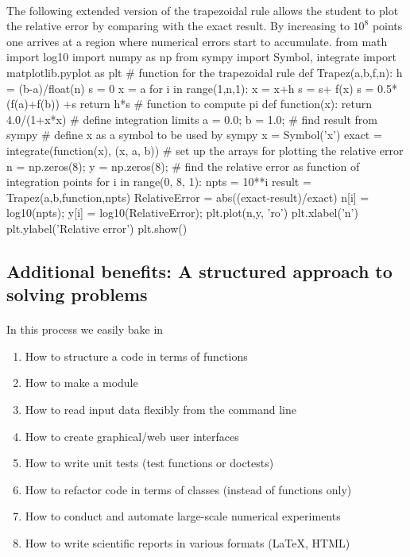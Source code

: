 \documentclass[%
twoside,                 %
final,                   %
10pt]{article}
\begin{document}
\paragraph{}
The following extended version of the trapezoidal rule allows the student to plot the relative error by comparing with the exact result. By increasing to $10^8$ points one arrives at a region where numerical errors start to accumulate.
\bpycod
from math import log10
import numpy as np
from sympy import Symbol, integrate
import matplotlib.pyplot as plt
# function for the trapezoidal rule
def Trapez(a,b,f,n):
   h = (b-a)/float(n)
   s = 0
   x = a
   for i in range(1,n,1):
       x = x+h
       s = s+ f(x)
   s = 0.5*(f(a)+f(b)) +s
   return h*s
#  function to compute pi
def function(x):
    return 4.0/(1+x*x)
# define integration limits
a = 0.0;  b = 1.0;
# find result from sympy
# define x as a symbol to be used by sympy
x = Symbol('x')
exact = integrate(function(x), (x, a, b))
# set up the arrays for plotting the relative error
n = np.zeros(8); y = np.zeros(8);
# find the relative error as function of integration points
for i in range(0, 8, 1):
    npts = 10**i
    result = Trapez(a,b,function,npts)
    RelativeError = abs((exact-result)/exact)
    n[i] = log10(npts); y[i] = log10(RelativeError);   
plt.plot(n,y, 'ro')
plt.xlabel('n')
plt.ylabel('Relative error')
plt.show()
\epycod





\subsection{Additional benefits: A structured approach to solving problems}

\paragraph{}
In this process we easily bake in
\begin{enumerate}
  \item How to structure a code in terms of functions

  \item How to make a module

  \item How to read input data flexibly from the command line

  \item How to create graphical/web user interfaces

  \item How to write unit tests (test functions or doctests)

  \item How to refactor code in terms of classes (instead of functions only)

  \item How to conduct and automate large-scale numerical experiments

  \item How to write scientific reports in various formats ({\LaTeX}, HTML)
\end{enumerate}
\end{document}

